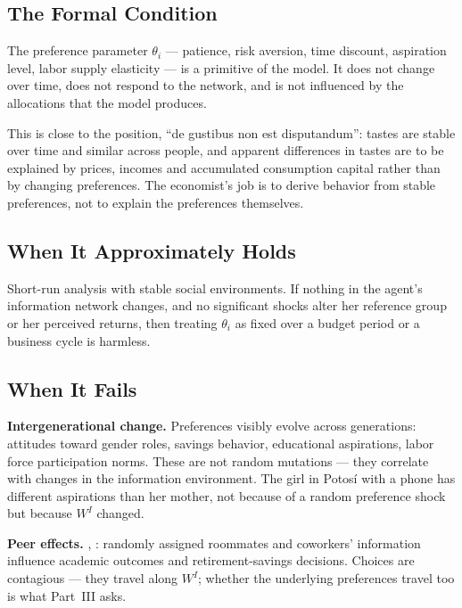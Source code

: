 \documentclass[../structural_economics_book.tex]{subfiles}
\begin{document}
\subsection{The Formal Condition}

The preference parameter $\theta_i$ --- patience, risk aversion, time discount, aspiration level, labor supply elasticity --- is a primitive of the model. It does not change over time, does not respond to the network, and is not influenced by the allocations that the model produces.

This is close to the \citet{stigler1977gustibus} position, ``de gustibus non est disputandum'': tastes are stable over time and similar across people, and apparent differences in tastes are to be explained by prices, incomes and accumulated consumption capital rather than by changing preferences. The economist's job is to derive behavior from stable preferences, not to explain the preferences themselves.

\subsection{When It Approximately Holds}

Short-run analysis with stable social environments. If nothing in the agent's information network changes, and no significant shocks alter her reference group or her perceived returns, then treating $\theta_i$ as fixed over a budget period or a business cycle is harmless.

\subsection{When It Fails}

\textbf{Intergenerational change.} Preferences visibly evolve across generations: attitudes toward gender roles, savings behavior, educational aspirations, labor force participation norms. These are not random mutations --- they correlate with changes in the information environment. The girl in Potos\'{i} with a phone has different aspirations than her mother, not because of a random preference shock but because $W^I$ changed.

\begin{sloppypar}\textbf{Peer effects.} \citet{sacerdote2001peer}, \citet{duflo2003role}: randomly assigned roommates and coworkers' information influence academic outcomes and retirement-savings decisions. Choices are contagious --- they travel along $W^I$; whether the underlying preferences travel too is what Part~III asks.\end{sloppypar}
\end{document}

